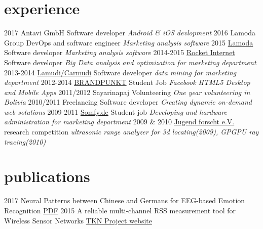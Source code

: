 \documentclass[]{friggeri-cv}
\begin{document}
\section{experience}

\begin{entrylist}
  \entry
    {2017}
    {{Antavi GmbH}}
    {Software developer}
    {\emph{Android \& iOS devlopment}}
  \entry
    {2016}
    {{Lamoda Group}}
    {DevOps and software engineer}
    {\emph{Marketing analysis software}}
  \entry
    {2015}
    {\href{http://www.lamoda.ru/}{Lamoda}}
    {Software developer}
    {\emph{Marketing analysis software}}
  \entry
    {2014-2015}
    {\href{http://www.rocket-internet.com/}{Rocket Internet}}
    {Software developer}
    {\emph{Big Data analysis and optimization for marketing department}}
  \entry
    {2013-2014}
    {\href{http://www.lamudi.com/}{Lamudi/Carmudi}}
    {Software developer}
    {\emph{data mining for marketing department}}
  \entry
    {2012-2014}
    {\href{http://brandpunkt.com}{BRANDPUNKT}}
    {Student Job}
    {\emph{Facebook HTML5 Desktop and Mobile Apps}}
  \entry
    {2011/2012}
    {Sayarinapaj}
    {Volunteering}
    {\emph{One year volunteering in Bolivia}}
  \entry
    {2010/2011}
    {Freelancing}
    {Software developer}
    {\emph{Creating dynamic on-demand web solutions}}
  \entry
    {2009-2011}
    {\href{http://www.somfy.de}{Somfy.de}}
    {Student job}
    {\emph{Developing and hardware administration for marketing department }}
  \entry
    {2009 \& 2010}
    {\href{http://jugend-forscht.de}{Jugend forscht e.V.}}
    {research competition}
    {\emph{ultrasonic range analyzer for 3d locating(2009), GPGPU ray tracing(2010)}}
\end{entrylist}

%

\section{publications}

\begin{entrylist}
  \entry
    {2017}
    {Neural Patterns between Chinese and Germans for EEG-based Emotion Recognition}
    {\href{http://ieeexplore.ieee.org/abstract/document/8008300/?reload=true}{PDF}}
    {}
  \entry
    {2015}
    {A reliable multi-channel RSS measurement tool for Wireless Sensor Networks}
    {\href{http://www.tkn.tu-berlin.de/index.php?id=159554}{TKN Project website}}
    {}
\end{entrylist}
\end{document}
